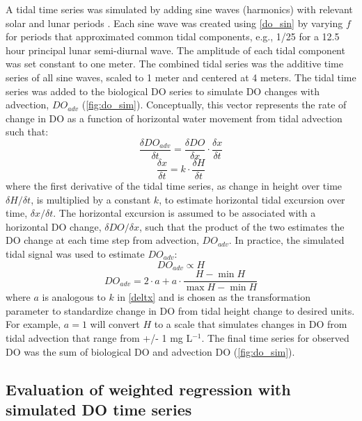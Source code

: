 \documentclass[letterpaper,12pt,oneside]{article}\usepackage[]{graphicx}\usepackage[]{color}
\begin{document}
A tidal time series was simulated by adding sine waves (harmonics) with relevant solar and lunar periods \citep{Foreman89}.  Each sine wave was created using \cref{do_sin} by varying $f$ for periods that approximated common tidal components, e.g., 1/25 for a 12.5 hour principal lunar semi-diurnal wave.  The amplitude of each tidal component was set constant to one meter.  The combined tidal series was the additive time series of all sine waves, scaled to 1 meter and centered  at 4 meters.  The tidal time series was added to the biological \ac{DO} series to simulate \ac{DO} changes with advection, $DO_{adv}$ (\cref{fig:do_sim}). Conceptually, this vector represents the rate of change in \ac{DO} as a function of horizontal water movement from tidal advection such that:
\begin{equation} \label{deltdo}
\frac{\delta DO_{adv}}{\delta t} = \frac{\delta DO}{\delta x} \cdot \frac{\delta x}{\delta t}
\end{equation}
\begin{equation} \label{deltx}
\frac{\delta x}{\delta t} = k \cdot \frac{\delta H}{\delta t}
\end{equation}
where the first derivative of the tidal time series, as change in height over time $\delta H / \delta t$, is multiplied by a constant $k$, to estimate horizontal tidal excursion over time, $\delta x / \delta t$.  The horizontal excursion is assumed to be associated with a horizontal \ac{DO} change, $\delta DO / \delta x$, such that the product of the two estimates the \ac{DO} change at each time step from advection, $DO_{adv}$. In practice, the simulated tidal signal was used to estimate $DO_{adv}$:
\begin{equation} \label{do_advp}
DO_{adv} \propto H
\end{equation}
\begin{equation} \label{do_adv}
DO_{adv} = 2\cdot a + a \cdot \frac{H- \min H}{\max H - \min H}
\end{equation}
where $a$ is analogous to $k$ in \cref{deltx} and is chosen as the transformation parameter to standardize change in \ac{DO} from tidal height change to desired units.  For example, $a = 1$ will convert $H$ to a scale that simulates changes in \ac{DO} from tidal advection that range from +/- 1 mg L$^{-1}$.  The final time series for observed \ac{DO} was the sum of biological \ac{DO} and advection \ac{DO} (\cref{fig:do_sim}).

\subsection{Evaluation of weighted regression with simulated \ac{DO} time series}
\end{document}
